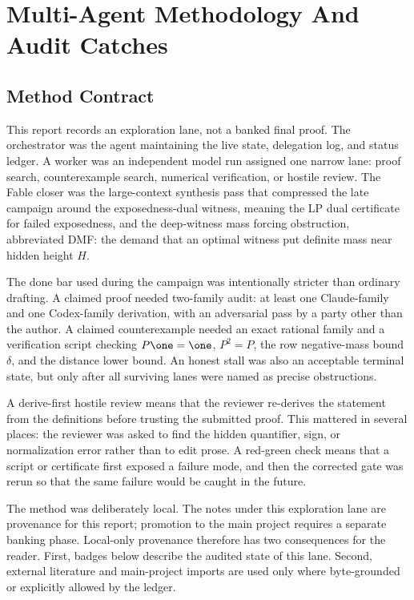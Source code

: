 \section{Multi-Agent Methodology And Audit Catches}

\subsection{Method Contract}

This report records an exploration lane, not a banked final proof.  The
orchestrator was the agent maintaining the live state, delegation log, and
status ledger.  A worker was an independent model run assigned one narrow
lane: proof search, counterexample search, numerical verification, or hostile
review.  The Fable closer was the large-context synthesis pass that compressed
the late campaign around the exposedness-dual witness, meaning the LP dual
certificate for failed exposedness, and the deep-witness mass forcing
obstruction, abbreviated DMF: the demand that an optimal witness put definite
mass near hidden height $H$.

The done bar used during the campaign was intentionally stricter than ordinary
drafting.  A claimed proof needed two-family audit: at least one Claude-family
and one Codex-family derivation, with an adversarial pass by a party other than
the author.  A claimed counterexample needed an exact rational family and a
verification script checking $P\one=\one$, $P^2=P$, the row negative-mass bound
$\delta$, and the distance lower bound.  An honest stall was also an acceptable
terminal state, but only after all surviving lanes were named as precise
obstructions.

A derive-first hostile review means that the reviewer re-derives the statement
from the definitions before trusting the submitted proof.  This mattered in
several places: the reviewer was asked to find the hidden quantifier, sign, or
normalization error rather than to edit prose.  A red-green check means that a
script or certificate first exposed a failure mode, and then the corrected gate
was rerun so that the same failure would be caught in the future.

The method was deliberately local.  The notes under this exploration lane are
provenance for this report; promotion to the main project requires a separate
banking phase.  Local-only provenance therefore has two consequences for the
reader.  First, badges below describe the audited state of this lane.  Second,
external literature and main-project imports are used only where byte-grounded
or explicitly allowed by the ledger.

